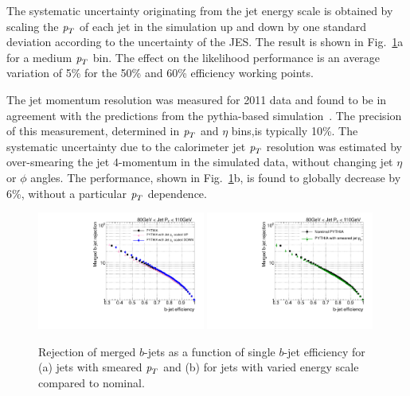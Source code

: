 The systematic uncertainty originating from the jet energy scale is obtained by scaling the ${\emph{p}_{T}}$ of each jet in the simulation up and down by one standard deviation according to the uncertainty of the JES.  The result is shown in Fig.~\ref{fig:jetresolution}a for a medium ${\emph{p}_{T}}$ bin. The effect on the likelihood performance is an average variation of 5\% for the 50\% and 60\% efficiency working points. 

The jet momentum resolution was measured for 2011 data and found to be in agreement with the predictions from the {\sc pythia}-based simulation~\cite{JER2011}. The precision of this measurement, determined in ${\emph{p}_{T}}$ and $\eta$ bins,is typically 10\%.
The systematic uncertainty due to the calorimeter jet ${\emph{p}_{T}}$ resolution was estimated by over-smearing the jet $4$-momentum in the simulated data, without changing jet $\eta$ or $\phi$ angles. The performance, shown in Fig.~\ref{fig:jetresolution}b, is found to globally decrease by 6\%, without a particular ${\emph{p}_{T}}$ dependence.


\begin{figure}[tp]
\centering
\includegraphics[width=0.49\textwidth]{FIGS/systematics/LlhoodKDE_ISO_JESUncertaintyTest_rejvseff080.pdf}
\includegraphics[width=0.49\textwidth]{FIGS/systematics/LlhoodKDE_ISO_SmearedJetPt_FIXEDBUGTest_rejvseff080.pdf}
\caption{Rejection of merged $b$-jets as a function of single $b$-jet efficiency for (a) jets with smeared ${\emph{p}_{T}}$ and (b) for jets with varied energy scale compared to nominal.}
\label{fig:jetresolution}
\end{figure}


